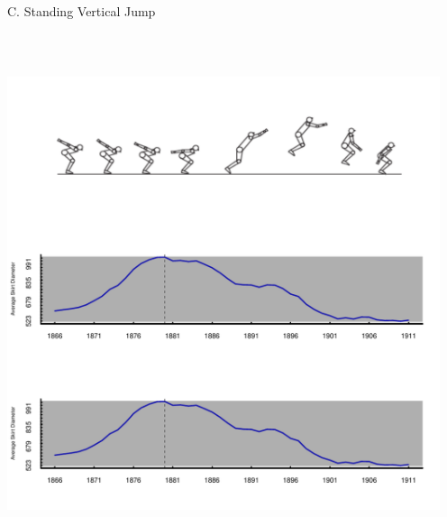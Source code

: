 \documentclass{article}\usepackage[]{graphicx}\usepackage[]{color}
\newenvironment{knitrout}{}{} %
\begin{document}
C. Standing Vertical Jump
\begin{knitrout}
\color{fgcolor}

\includegraphics[width=5in,height=6in]{figure/latex-unnamed-chunk-7-1} \hfill{}



\end{knitrout}
\end{document}
